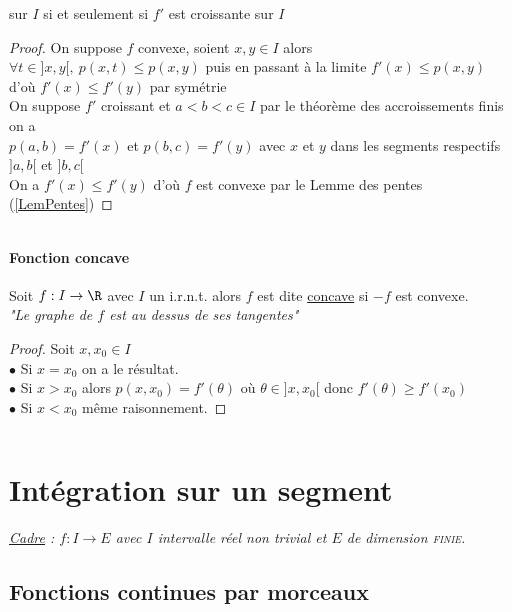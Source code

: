 {{    sur $I$ si et seulement si $f'$ est croissante sur $I$}
    \begin{proof}
    \fbox{$\Rightarrow$} On suppose $f$ convexe, soient $x,y \in I$ alors \\
    $\forall t\in ]x,y[ ,~p(x,t)\leq p(x,y)$ puis en passant à la limite $f'(x) \leq p(x,y)$ d'où $f'(x)\leq f'(y)$ par symétrie \\
    \fbox{$\Leftarrow$} On suppose $f'$ croissant et $a<b<c \in I$ par le théorème des accroissements finis on a\\
    $p(a,b) = f'(x)$ et $p(b,c) = f'(y)$ avec $x$ et $y$ dans les segments respectifs $]a,b[$ et $]b,c[$\\
    On a $f'(x) \leq f'(y)$ d'où $f$ est convexe par le Lemme des pentes (\ref{LemPentes})
    \end{proof}
    ${}$ \\  \traitd
    \paragraph{Fonction concave}
        Soit $f:I\rightarrow \R$ avec $I$ un i.r.n.t. alors $f$ est dite \underline{concave} si $-f$ est convexe. \trait
    \\ \textit{"Le graphe de $f$ est au dessus de ses tangentes"}
    \begin{proof}
    Soit $x,x_0 \in I$ \\$\bullet$ Si $x=x_0$ on a le résultat.\\ $\bullet$ Si $x>x_0$ alors $p(x,x_0) = f'(\theta )$ où 
    $\theta \in ]x,x_0[$ donc $f'(\theta ) \geq f'(x_0)$ \\ $\bullet$ Si $x<x_0$ même raisonnement.
    \end{proof} ${}$
\section{Intégration sur un segment}
    \textit{\underline{Cadre} : $f:I\rightarrow E$ avec $I$ intervalle réel non trivial et $E$ de dimension \textsc{finie}.}
\subsection{Fonctions continues par morceaux}
    \traitd
}
